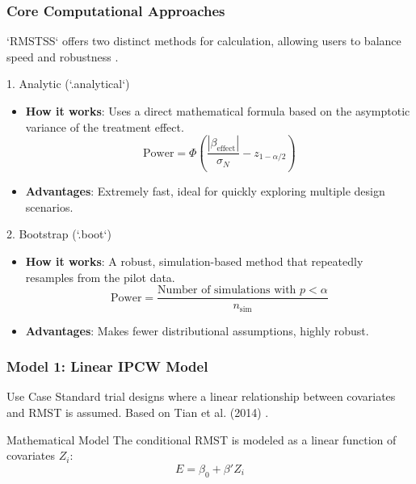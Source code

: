 \documentclass{beamer}
\begin{document}
\begin{frame}
\frametitle{Core Computational Approaches}
`RMSTSS` offers two distinct methods for calculation, allowing users to balance speed and robustness \cite{[1]}.

\begin{block}{1. Analytic (`.analytical`)}
\begin{itemize}
    \item \textbf{How it works}: Uses a direct mathematical formula based on the asymptotic variance of the treatment effect.
    $$\text{Power} = \Phi\left( \frac{|\beta_{\text{effect}}|}{\sigma_N} - z_{1-\alpha/2} \right)$$
    \item \textbf{Advantages}: Extremely fast, ideal for quickly exploring multiple design scenarios.
\end{itemize}
\end{block}

\begin{block}{2. Bootstrap (`.boot`)}
\begin{itemize}
    \item \textbf{How it works}: A robust, simulation-based method that repeatedly resamples from the pilot data.
    $$\text{Power} = \frac{\text{Number of simulations with } p < \alpha}{n_{\text{sim}}}$$
    \item \textbf{Advantages}: Makes fewer distributional assumptions, highly robust.
\end{itemize}
\end{block}
\end{frame}

\begin{frame}
\frametitle{Model 1: Linear IPCW Model}
\begin{block}{Use Case}
Standard trial designs where a linear relationship between covariates and RMST is assumed. Based on Tian et al. (2014) \cite{[1]}.
\end{block}

\begin{block}{Mathematical Model}
The conditional RMST is modeled as a linear function of covariates $Z_i$:
$$E = \beta_0 + \beta' Z_i$$
\end{block}
\end{frame}
\end{document}
